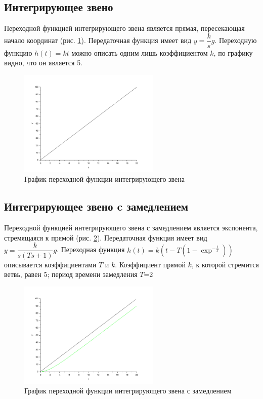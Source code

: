 \documentclass[a4paper,12pt,russian]{article} %
\begin{document}
\subsection{Интегрирующее звено}
Переходной функцией интегрирующего звена является прямая, пересекающая начало координат (рис. \ref{plot_int}). Передаточная функция имеет вид $y=\dfrac{k}{s}g$. Переходную функцию $h(t)=kt$ можно описать одним лишь коэффициентом $k$, по графику видно, что он является 5.
\begin{figure}[H]
	\centering\includegraphics[width=0.6\textwidth]{plot_int.png}
	\caption{График переходной функции интегрирующего звена}\label{plot_int}
\end{figure}

\subsection{Интегрирующее звено c замедлением}
Переходной функцией интегрирующего звена с замедлением является  экспонента, стремящаяся к прямой (рис. \ref{plot_int_slow}). Передаточная функция имеет вид $y=\dfrac{k}{s(Ts+1)}g$. Переходная функция $h(t)=k(t-T(1-\exp^{-\frac{t}{T}}))$ описывается коэффициентами $T$ и $k$. Коэффициент прямой $k$, к которой стремится ветвь, равен 5; период времени замедления $T$=2
\begin{figure}[H]
	\centering\includegraphics[width=0.6\textwidth]{plot_int_slow.png}
	\caption{График переходной функции интегрирующего звена с замедлением}\label{plot_int_slow}
\end{figure}
\end{document}

